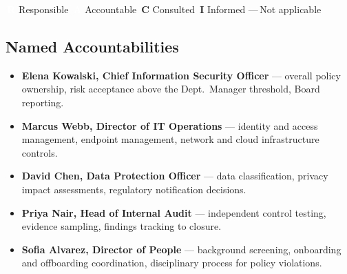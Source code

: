 \vspace{2pt}
\noindent\footnotesize
\colorbox{steel}{\textcolor{white}{\textbf{\,R\,}}}\,Responsible \quad
\colorbox{policynavy}{\textcolor{white}{\textbf{\,A\,}}}\,Accountable \quad
\colorbox{amber!55}{\textbf{\,C\,}}\,Consulted \quad
\colorbox{fog}{\textbf{\,I\,}}\,Informed \quad
{\color{black!35}---}\,Not applicable
\normalsize

\subsection{Named Accountabilities}
\begin{itemize}[topsep=4pt, itemsep=2pt]
  \item \textbf{Elena Kowalski, Chief Information Security Officer} --- overall policy
        ownership, risk acceptance above the Dept.\ Manager threshold, Board reporting.
  \item \textbf{Marcus Webb, Director of IT Operations} --- identity and access management,
        endpoint management, network and cloud infrastructure controls.
  \item \textbf{David Chen, Data Protection Officer} --- data classification, privacy
        impact assessments, regulatory notification decisions.
  \item \textbf{Priya Nair, Head of Internal Audit} --- independent control testing,
        evidence sampling, findings tracking to closure.
  \item \textbf{Sofia Alvarez, Director of People} --- background screening, onboarding
        and offboarding coordination, disciplinary process for policy violations.
\end{itemize}
